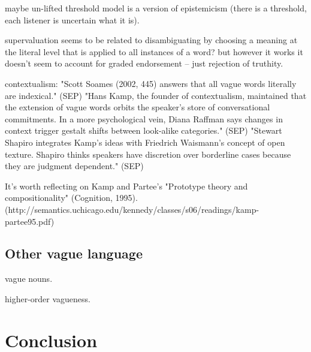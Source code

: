 \documentclass[11pt]{amsart}
\begin{document}
 maybe un-lifted threshold model is a version of epistemicism (there is a threshold, each listener is uncertain what it is).
 
supervaluation seems to be related to disambiguating by choosing a meaning at the literal level that is applied to all instances of a word? but however it works it doesn't seem to account for graded endorsement -- just rejection of truthity.

contextualism: "Scott Soames (2002, 445) answers that all vague words literally are indexical." (SEP)
"Hans Kamp, the founder of contextualism, maintained that the extension of vague words orbits the speaker's store of conversational commitments. In a more psychological vein, Diana Raffman says changes in context trigger gestalt shifts between look-alike categories." (SEP)
"Stewart Shapiro integrates Kamp's ideas with Friedrich Waismann's concept of open texture. Shapiro thinks speakers have discretion over borderline cases because they are judgment dependent." (SEP)

It's worth reflecting on Kamp and Partee's "Prototype theory and compositionality" (Cognition, 1995). (http://semantics.uchicago.edu/kennedy/classes/s06/readings/kamp-partee95.pdf)
  
\subsection{Other vague language}

vague nouns. 

higher-order vagueness.

\section{Conclusion}
\end{document}
